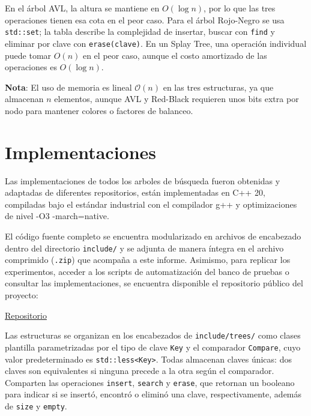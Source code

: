 \documentclass[11pt,letterpaper]{article}
\begin{document}
\noindent
En el árbol AVL, la altura se mantiene en $O(\log n)$, por lo que las tres
operaciones tienen esa cota en el peor caso. Para el árbol Rojo-Negro se usa
\texttt{std::set}; la tabla describe la complejidad de insertar, buscar con
\texttt{find} y eliminar por clave con \texttt{erase(clave)}. En un Splay Tree,
una operación individual puede tomar $O(n)$ en el peor caso, aunque el costo
amortizado de las operaciones es $O(\log n)$.

\textbf{Nota}: El uso de memoria es lineal $\mathcal{O}(n)$ en las tres estructuras, ya que almacenan $n$ elementos, aunque AVL y Red-Black requieren unos bits extra por nodo para mantener colores o factores de balanceo.



\newpage

\section{Implementaciones}

Las implementaciones de todos los arboles de búsqueda fueron obtenidas y adaptadas de diferentes repositorios, están implementadas en C++ 20, compiladas bajo
el estándar industrial con el compilador g++ y optimizaciones de nivel -O3 -march=native.

El código fuente completo se encuentra modularizado en archivos de encabezado dentro del directorio \texttt{include/} y se adjunta de manera íntegra en el archivo comprimido (\texttt{.zip}) que acompaña a este informe. Asimismo, para replicar los experimentos, acceder a los scripts de automatización del banco de pruebas o consultar las implementaciones, se encuentra disponible el repositorio público del proyecto:

\begin{center}
\href{https://github.com/StackDs/EDAA-Experiments}{ Repositorio}
\end{center}

Las estructuras se organizan en los encabezados de \texttt{include/trees/}
como clases plantilla parametrizadas por el tipo de clave \texttt{Key} y
el comparador \texttt{Compare}, cuyo valor predeterminado es
\texttt{std::less<Key>}. Todas almacenan claves únicas: dos claves son
equivalentes si ninguna precede a la otra según el comparador. Comparten
las operaciones \texttt{insert}, \texttt{search} y \texttt{erase}, que
retornan un booleano para indicar si se insertó, encontró o eliminó una
clave, respectivamente, además de \texttt{size} y \texttt{empty}.
\end{document}
